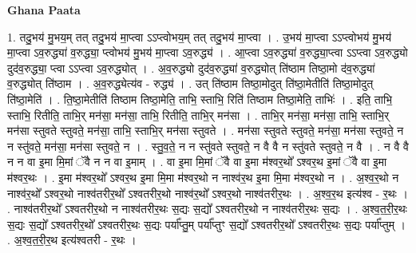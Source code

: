 \documentclass[17pt]{extarticle}
\begin{document}
\textbf{Ghana Paata } \newline

1. तदु॒भय॑ मु॒भय॒म् तत् तदु॒भय॑ मा॒प्त्वा ऽऽप्त्वोभय॒म् तत् तदु॒भय॑ मा॒प्त्वा । . उ॒भय॑ मा॒प्त्वा ऽऽप्त्वोभय॑ मु॒भय॑ मा॒प्त्वा ऽव॒रुद्ध्या॑ व॒रुद्ध्या॒ प्त्वोभय॑ मु॒भय॑ मा॒प्त्वा ऽव॒रुद्ध्य॑ । . आ॒प्त्वा ऽव॒रुद्ध्या॑ व॒रुद्ध्या॒प्त्वा ऽऽप्त्वा ऽव॒रुद्ध्यो दुद॑व॒रुद्ध्या॒ प्त्वा ऽऽप्त्वा ऽव॒रुद्ध्योत् । . अ॒व॒रुद्ध्यो दुद॑व॒रुद्ध्या॑ व॒रुद्ध्योत् ति॑ष्ठाम तिष्ठा॒मो द॑व॒रुद्ध्या॑ व॒रुद्ध्योत् ति॑ष्ठाम । . अ॒व॒रुद्ध्येत्य॑व - रुद्ध्य॑ । . उत् ति॑ष्ठाम तिष्ठा॒मोदुत् ति॑ष्ठा॒मेतीति॑ तिष्ठा॒मोदुत् ति॑ष्ठा॒मेति॑ । . ति॒ष्ठा॒मेतीति॑ तिष्ठाम तिष्ठा॒मेति॒ ताभि॒ स्ताभि॒ रिति॑ तिष्ठाम तिष्ठा॒मेति॒ ताभिः॑ । . इति॒ ताभि॒ स्ताभि॒ रितीति॒ ताभि॒र् मन॑सा॒ मन॑सा॒ ताभि॒ रितीति॒ ताभि॒र् मन॑सा । . ताभि॒र् मन॑सा॒ मन॑सा॒ ताभि॒ स्ताभि॒र् मन॑सा स्तुवते स्तुवते॒ मन॑सा॒ ताभि॒ स्ताभि॒र् मन॑सा स्तुवते । . मन॑सा स्तुवते स्तुवते॒ मन॑सा॒ मन॑सा स्तुवते॒ न न स्तु॑वते॒ मन॑सा॒ मन॑सा स्तुवते॒ न । . स्तु॒व॒ते॒ न न स्तु॑वते स्तुवते॒ न वै वै न स्तु॑वते स्तुवते॒ न वै । . न वै वै न न वा इ॒मा मि॒मां ॅवै न न वा इ॒माम् । . वा इ॒मा मि॒मां ॅवै वा इ॒मा म॑श्वर॒थो᳚ ऽश्वर॒थ इ॒मां ॅवै वा इ॒मा म॑श्वर॒थः । . इ॒मा म॑श्वर॒थो᳚ ऽश्वर॒थ इ॒मा मि॒मा म॑श्वर॒थो न नाश्व॑र॒थ इ॒मा मि॒मा म॑श्वर॒थो न । . अ॒श्व॒र॒थो न नाश्व॑र॒थो᳚ ऽश्वर॒थो नाश्व॑तरीर॒थो᳚ ऽश्वतरीर॒थो नाश्व॑र॒थो᳚ ऽश्वर॒थो नाश्व॑तरीर॒थः । . अ॒श्व॒र॒थ इत्य॑श्व - र॒थः । . नाश्व॑तरीर॒थो᳚ ऽश्वतरीर॒थो न नाश्व॑तरीर॒थः स॒द्यः स॒द्यो᳚ ऽश्वतरीर॒थो न नाश्व॑तरीर॒थः स॒द्यः । . अ॒श्व॒त॒री॒र॒थः स॒द्यः स॒द्यो᳚ ऽश्वतरीर॒थो᳚ ऽश्वतरीर॒थः स॒द्यः पर्या᳚प्तु॒म् पर्या᳚प्तुꣳ स॒द्यो᳚ ऽश्वतरीर॒थो᳚ ऽश्वतरीर॒थः स॒द्यः पर्या᳚प्तुम् । . अ॒श्व॒त॒री॒र॒थ इत्य॑श्वतरी - र॒थः । \newline
\end{document}

